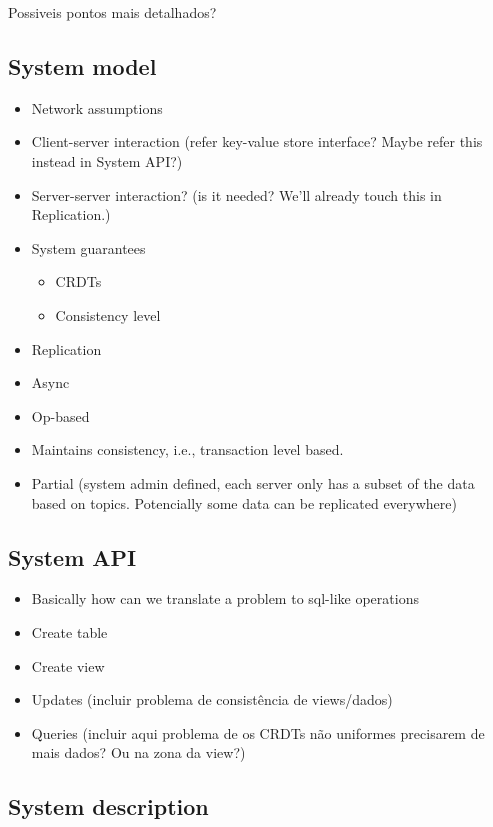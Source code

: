 \documentclass{vldb}
\begin{document}
\vspace{8cm}
Possiveis pontos mais detalhados?

\subsection{System model}

\begin{itemize}
	\item Network assumptions
	\item Client-server interaction (refer key-value store interface? Maybe refer this instead in System API?)
	\item Server-server interaction? (is it needed? We'll already touch this in Replication.)
	\item System guarantees
	\begin{itemize}
		\item CRDTs
		\item Consistency level	
	\end{itemize}
	\item Replication
		\item Async
		\item Op-based
		\item Maintains consistency, i.e., transaction level based.
		\item Partial (system admin defined, each server only has a subset of the data based on topics. Potencially some data can be replicated everywhere)
\end{itemize}

\subsection{System API}

\begin{itemize}
	\item Basically how can we translate a problem to sql-like operations
	\item Create table
	\item Create view
	\item Updates (incluir problema de consistência de views/dados)
	\item Queries (incluir aqui problema de os CRDTs não uniformes precisarem de mais dados? Ou na zona da view?)
\end{itemize}

\subsection{System description}
\end{document}
